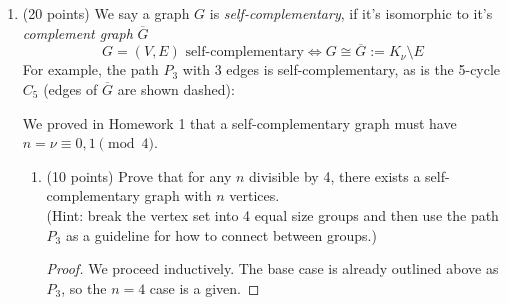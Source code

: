 \documentclass[11pt]{article}
\begin{document}
\begin{enumerate}
\begin{proof}
        So we can conclude that for trees with no vertices of degree two, there must be at least two more leaves than non-leaves.
      \end{proof}
      

    \item (20 points) We say a graph \(G\) is \textit{self-complementary}, if it's isomorphic to it's \textit{complement graph} \(\overline{G}\) 
      \[G = (V,E) \text{ self-complementary} \iff G \cong \overline{G} := K_{\nu} \setminus E\]
      For example, the path \(P_3\) with 3 edges is self-complementary, as is the 5-cycle \(C_5\) (edges of \(\overline{G}\) are shown dashed):

    \begin{minipage}{0.45\textwidth}
      \centering
    \end{minipage}
    \begin{minipage}{0.45\textwidth}
      \centering
    \end{minipage}

    We proved in Homework 1 that a self-complementary graph must have \(n = \nu \equiv 0,1 \pmod 4\).
    \begin{enumerate}
      \item (10 points) Prove that for any \(n\) divisible by 4, there exists a self-complementary graph with \(n\) vertices. \\
        (Hint: break the vertex set into 4 equal size groups and then use the path \(P_3\) as a guideline for how to connect between groups.)
        \begin{proof}
          We proceed inductively.  The base case is already outlined above as \(P_3\), so the \(n = 4\) case is a given.


\end{proof}
\end{enumerate}
\end{enumerate}
\end{document}
